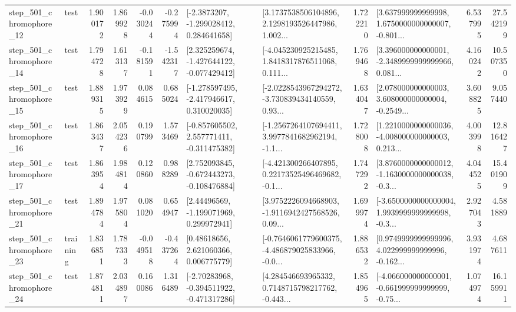\begin{tabular}{llrrrrllrlrr}
  step\_501\_chromophore\_12 &      test &      1.900172 &    1.869928 &     -0.030244 & -0.275994 &     [-2.3873207, -1.299028412, 0.284641658] &  [3.1737538506104896, 2.1298193526447986, 1.002... &       1.722210 &  [3.637999999999998, 1.6750000000000007, -0.801... &            6.537995 &         27.542199 \\
  step\_501\_chromophore\_14 &      test &      1.794728 &    1.613137 &     -0.181591 & -1.542317 &   [2.325259674, -1.427644122, -0.077429412] &  [-4.045230925215485, 1.8418317876511068, 0.111... &       1.769468 &  [3.396000000000001, -2.3489999999999966, 0.081... &            4.160242 &         10.507350 \\
  step\_501\_chromophore\_15 &      test &      1.889315 &    1.973929 &      0.084615 &  0.685024 &   [-1.278597495, -2.417946617, 0.310020035] &  [-2.0228543967294272, -3.730839434140559, 0.93... &       1.634047 &  [2.078000000000003, 3.608000000000004, -0.2549... &            3.608825 &          9.057440 \\
  step\_501\_chromophore\_16 &      test &      1.863437 &    2.054236 &      0.190799 &  1.573469 &   [-0.857605502, 2.557771411, -0.311475382] &  [-1.2567264107694411, 3.9977841682962194, -1.1... &       1.728008 &  [1.2210000000000036, -4.008000000000003, 0.213... &            4.003998 &         12.816427 \\
  step\_501\_chromophore\_17 &      test &      1.863954 &    1.984814 &      0.120860 &  0.988289 &   [2.752093845, -0.672443273, -0.108476884] &  [-4.421300266407895, 0.22173525496469682, -0.1... &       1.747292 &  [3.8760000000000012, -1.1630000000000038, -0.3... &            4.044525 &         15.401909 \\
  step\_501\_chromophore\_21 &      test &      1.894784 &    1.975804 &      0.081020 &  0.654947 &     [2.44496569, -1.199071969, 0.299972941] &  [3.9752226094668903, -1.9116942427568526, 0.09... &       1.699974 &  [-3.6500000000000004, 1.9939999999999998, -0.3... &            2.927043 &          4.581889 \\
  step\_501\_chromophore\_23 &  training &      1.836851 &    1.787333 &     -0.049518 & -0.437264 &      [0.48618656, 2.621060366, 0.006775779] &  [-0.7646061779600375, -4.486879025833966, -0.0... &       1.886532 &  [0.9749999999999996, 4.022999999999996, -0.162... &            3.931974 &          4.687611 \\
  step\_501\_chromophore\_24 &      test &      1.874811 &    2.034897 &      0.160086 &  1.316489 &   [-2.70283968, -0.394511922, -0.471317286] &  [4.284546693965332, 0.7148715798217762, -0.443... &       1.854965 &  [-4.066000000000001, -0.661999999999999, -0.75... &            1.074974 &         16.159911 \\

\end{tabular}
